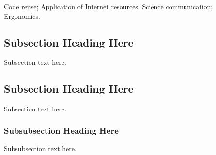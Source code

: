 \documentclass[10pt,journal,compsoc]{IEEEtran}
\begin{document}
	Code reuse;
	Application of Internet resources;
	Science communication;
	Ergonomics.
	\subsection{Subsection Heading Here}
	Subsection text here.
	
	
	
	\subsection{Subsection Heading Here}
	Subsection text here.
	
	
	\subsubsection{Subsubsection Heading Here}
	Subsubsection text here.
	
	
	
	
\end{document}
